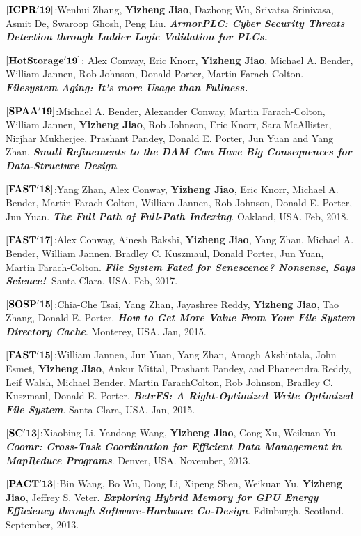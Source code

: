 \documentclass[margin, 10pt]{res} %
\begin{document}
\begin{resume}
$[\bf{ICPR'19}]$:Wenhui Zhang, \textbf{Yizheng Jiao}, Dazhong Wu, Srivatsa Srinivasa, Asmit De, Swaroop Ghosh, Peng Liu.
\textbf{\textit{ArmorPLC: Cyber Security Threats Detection through Ladder Logic Validation for PLCs.}}

$[\bf{HotStorage'19}]$:
Alex Conway, Eric Knorr, \textbf{Yizheng Jiao}, Michael A. Bender, William Jannen, Rob Johnson, Donald Porter, Martin Farach-Colton.
\textbf{\textit{Filesystem Aging: It’s more Usage than Fullness.}}


$[\bf{SPAA'19}]$:Michael A. Bender, Alexander Conway, Martin Farach-Colton, William Jannen,
\textbf{Yizheng Jiao}, Rob Johnson, Eric Knorr, Sara McAllister, Nirjhar
Mukherjee, Prashant Pandey, Donald E. Porter, Jun Yuan and Yang Zhan. \textbf{\textit{Small Refinements to the DAM Can Have Big Consequences for
Data-Structure Design}}.

$[\bf{FAST'18}]$:Yang Zhan, Alex Conway, \textbf{Yizheng Jiao}, Eric Knorr, Michael A. Bender, Martin Farach-Colton, William Jannen, Rob Johnson, Donald E. Porter, Jun Yuan.
\textbf{\textit{The Full Path of Full-Path Indexing}}. 
Oakland, USA. Feb, 2018.

$[\bf{FAST'17}]$:Alex Conway, Ainesh Bakshi, \textbf{Yizheng Jiao}, Yang Zhan, Michael A. Bender, William Jannen, Bradley C. Kuszmaul, Donald Porter, Jun Yuan, Martin Farach-Colton.
\textbf{\textit{File System Fated for Senescence? Nonsense, Says Science!}}. 
Santa Clara, USA. Feb, 2017.

$[\bf{SOSP'15}]$:Chia-Che Tsai, Yang Zhan, Jayashree Reddy, \textbf{Yizheng Jiao}, Tao Zhang, Donald E. Porter. \textbf{\textit{How to Get More Value From Your File System Directory Cache}}. Monterey, USA. Jan, 2015.

$[\bf{FAST'15}]$:William Jannen, Jun Yuan, Yang Zhan, Amogh Akshintala, John Esmet, \textbf{Yizheng Jiao}, Ankur Mittal, Prashant Pandey, and Phaneendra Reddy, Leif Walsh, Michael Bender, Martin FarachColton, Rob Johnson, Bradley C. Kuszmaul, Donald E. Porter. \textbf{\textit{BetrFS: A Right-Optimized Write Optimized File System}}. Santa Clara, USA. Jan, 2015.

$[\bf{SC'13}]$:Xiaobing Li, Yandong Wang, \textbf{Yizheng Jiao}, Cong Xu, Weikuan Yu. \textbf{\textit{Coomr: Cross-Task Coordination for Efficient Data Management in MapReduce Programs}}. Denver, USA. November, 2013.

$[\bf{PACT'13}]$:Bin Wang, Bo Wu, Dong Li, Xipeng Shen, Weikuan Yu, \textbf{Yizheng Jiao}, Jeffrey S. Veter. \textbf{\textit{Exploring Hybrid Memory for GPU Energy Efficiency through Software-Hardware Co-Design}}. Edinburgh, Scotland. September, 2013.


\end{resume}
\end{document}
